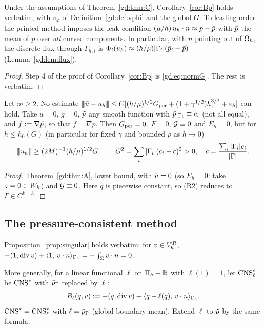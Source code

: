 \begin{corollary}\label{gd:cor:Bp}
Under the assumptions of Theorem~\ref{gd:thm:C}, Corollary~\ref{cor:Bp} holds verbatim, with $v_\varphi$ of Definition~\ref{gd:def:vphi} and the global $G$. To leading order the printed method imposes the leak condition $(\mu/h)\,u_h\cdot n\approx p-\bar p$ with $\bar p$ the mean of $p$ over \emph{all} curved components. In particular, with $n$ pointing out of $\Omega_h$, the discrete flux through $\Gamma_{h,i}$ is $\Phi_i(u_h)\approx(h/\mu)|\Gamma_i|(\bar p_i-\bar p)$ (Lemma~\ref{gd:lem:flux}).
\end{corollary}

\begin{proof}
Step 4 of the proof of Corollary~\ref{cor:Bp} is \eqref{gd:eq:normG}. The rest is verbatim.
\end{proof}

\begin{proposition}\label{gd:prop:Gglobal}
Let $m\ge2$. No estimate $|\!|\!|\tilde u-u_h|\!|\!|\le C[(h/\mu)^{1/2}G_{\rm per}+(1+\gamma^{1/2})h_\Gamma^{3/2}+\varepsilon_h]$ can hold. Take $u=0$, $g=0$, $\tilde p$ any smooth function with $\tilde p|_{\Gamma_i}\equiv c_i$ (not all equal), and $\tilde f:=\nabla\tilde p$, so that $f=\nabla p$. Then $G_{\rm per}=0$, $F=0$, $\mathcal G\equiv0$ and $E_h=0$, but for $h\le h_0(G)$ (in particular for fixed $\gamma$ and bounded $\rho$ as $h\to0$)
\[
|\!|\!|u_h|\!|\!|\ge(2M)^{-1}(h/\mu)^{1/2}G,\qquad G^2=\sum_i|\Gamma_i|(c_i-\bar c)^2>0,\quad\bar c=\frac{\sum_i|\Gamma_i|c_i}{|\Gamma|}.
\]
\end{proposition}

\begin{proof}
Theorem~\ref{gd:thm:A}, lower bound, with $\tilde u=0$ (so $E_h=0$: take $z=0\in W_h$) and $\mathcal G\equiv0$. Here $q$ is piecewise constant, so (R2) reduces to $\Gamma\in C^{k+3}$.
\end{proof}

\subsection{The pressure-consistent method}\label{gd:sec:D}

Proposition~\ref{prop:singular} holds verbatim: for $v\in V_h^R$, $-(1,\operatorname{div} v)+\langle 1,\, v\cdot n\rangle_{\Gamma_h}=-\int_\Sigma v\cdot n=0$.

More generally, for a linear functional $\ell$ on $\Pi_h+\mathbb R$ with $\ell(1)=1$, let $\mathrm{CNS}^\ast_\ell$ be $\mathrm{CNS}^\ast$ with $\bar p_{\Gamma}$ replaced by $\ell$:
\[
B_\ell(q,v):=-(q,\operatorname{div} v)+\langle q-\ell(q),\, v\cdot n\rangle_{\Gamma_h}.
\]
$\mathrm{CNS}^\ast=\mathrm{CNS}^\ast_\ell$ with $\ell=\bar p_{\Gamma}$ (global boundary mean). Extend $\ell$ to $\tilde p$ by the same formula.

